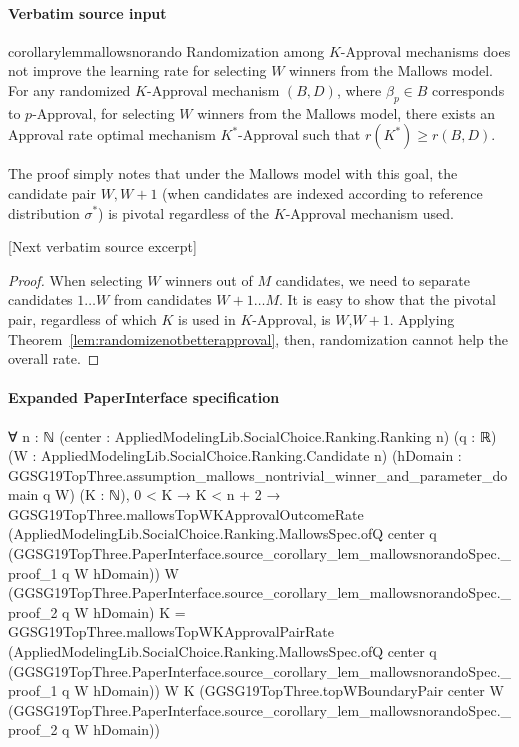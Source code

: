 \documentclass[10pt]{article}
\begin{document}
\paragraph{Verbatim source input}
\begin{ReviewVerbatim}
\begin{restatable}{corollary}{lemmallowsnorando}
	\label{lem:mallowsnorando}
			Randomization among $K$-Approval mechanisms does not improve the learning rate for selecting $W$ winners from the Mallows model. For any randomized $K$-Approval mechanism $(B,D)$, where $\beta_p\in B$ corresponds to $p$-Approval, for selecting $W$ winners from the Mallows model, there exists an Approval rate optimal mechanism $K^*$-Approval such that $r(K^*) \geq r(B,D)$.

\end{restatable}

The proof simply notes that under the Mallows model with this goal, the candidate pair $W, W+1$ (when candidates are indexed according to reference distribution $\sigma^*$) is pivotal regardless of the $K$-Approval mechanism used.

[Next verbatim source excerpt]

\lemmallowsnorando*
\begin{proof}
	When selecting $W$ winners out of $M$ candidates, we need to separate candidates $1 \dots W$ from candidates $W + 1 \dots M$. It is easy to show that the pivotal pair, regardless of which $K$ is used in $K$-Approval, is $W$,$W+1$. Applying Theorem~\ref{lem:randomizenotbetterapproval}, then, randomization cannot help the overall rate.
\end{proof}
\end{ReviewVerbatim}



\paragraph{Expanded PaperInterface specification}
\begin{ReviewVerbatim}
∀ {n : ℕ} (center : AppliedModelingLib.SocialChoice.Ranking.Ranking n) (q : ℝ)
  (W : AppliedModelingLib.SocialChoice.Ranking.Candidate n)
  (hDomain : GGSG19TopThree.assumption_mallows_nontrivial_winner_and_parameter_domain q W) (K : ℕ),
  0 < K →
    K < n + 2 →
      GGSG19TopThree.mallowsTopWKApprovalOutcomeRate
          (AppliedModelingLib.SocialChoice.Ranking.MallowsSpec.ofQ center q
            (GGSG19TopThree.PaperInterface.source_corollary_lem_mallowsnorandoSpec._proof_1 q W hDomain))
          W (GGSG19TopThree.PaperInterface.source_corollary_lem_mallowsnorandoSpec._proof_2 q W hDomain) K =
        GGSG19TopThree.mallowsTopWKApprovalPairRate
          (AppliedModelingLib.SocialChoice.Ranking.MallowsSpec.ofQ center q
            (GGSG19TopThree.PaperInterface.source_corollary_lem_mallowsnorandoSpec._proof_1 q W hDomain))
          W K
          (GGSG19TopThree.topWBoundaryPair center W
            (GGSG19TopThree.PaperInterface.source_corollary_lem_mallowsnorandoSpec._proof_2 q W hDomain))
\end{ReviewVerbatim}
\end{document}
